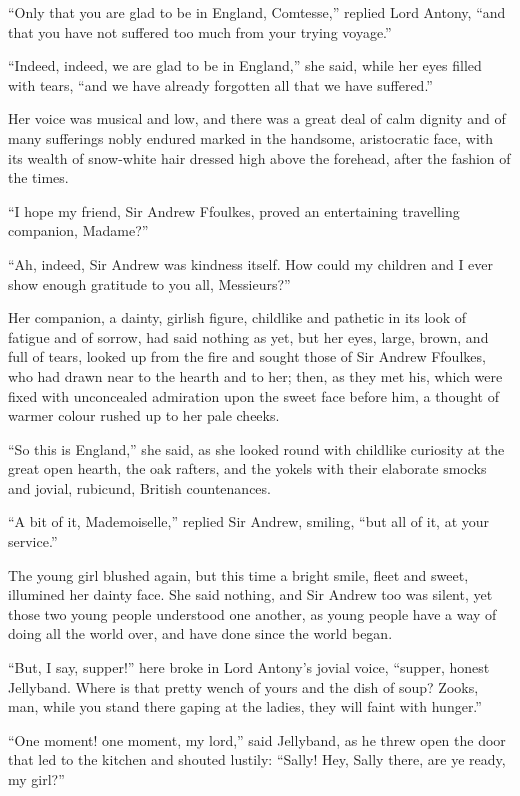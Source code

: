 \documentclass[paper=a5,BCOR=7mm,twoside,DIV=calc,12pt,usegeometry,chapterprefix,endperiod,headings=big]{scrbook}
\begin{document}
\enquote{Only that you are glad to be in England, Comtesse,} replied Lord Antony, \enquote{and that you have not suffered too much from your trying voyage.}

\enquote{Indeed, indeed, we are glad to be in England,} she said, while her eyes filled with tears, \enquote{and we have already forgotten all that we have suffered.}

Her voice was musical and low, and there was a great deal of calm dignity and of many sufferings nobly endured marked in the handsome, aristocratic face, with its wealth of snow-white hair dressed high above the forehead, after the fashion of the times.

\enquote{I hope my friend, Sir Andrew Ffoulkes, proved an entertaining travelling companion, Madame?}

\enquote{Ah, indeed, Sir Andrew was kindness itself. How could my children and I ever show enough gratitude to you all, Messieurs?}

Her companion, a dainty, girlish figure, childlike and pathetic in its look of fatigue and of sorrow, had said nothing as yet, but her eyes, large, brown, and full of tears, looked up from the fire and sought those of Sir Andrew Ffoulkes, who had drawn near to the hearth and to her; then, as they met his, which were fixed with unconcealed admiration upon the sweet face before him, a thought of warmer colour rushed up to her pale cheeks.

\enquote{So this is England,} she said, as she looked round with childlike curiosity at the great open hearth, the oak rafters, and the yokels with their elaborate smocks and jovial, rubicund, British countenances.

\enquote{A bit of it, Mademoiselle,} replied Sir Andrew, smiling, \enquote{but all of it, at your service.}

The young girl blushed again, but this time a bright smile, fleet and sweet, illumined her dainty face. She said nothing, and Sir Andrew too was silent, yet those two young people understood one another, as young people have a way of doing all the world over, and have done since the world began.

\enquote{But, I say, supper!} here broke in Lord Antony's jovial voice, \enquote{supper, honest Jellyband. Where is that pretty wench of yours and the dish of soup? Zooks, man, while you stand there gaping at the ladies, they will faint with hunger.}

\enquote{One moment! one moment, my lord,} said Jellyband, as he threw open the door that led to the kitchen and shouted lustily: \enquote{Sally! Hey, Sally there, are ye ready, my girl?}
\end{document}
